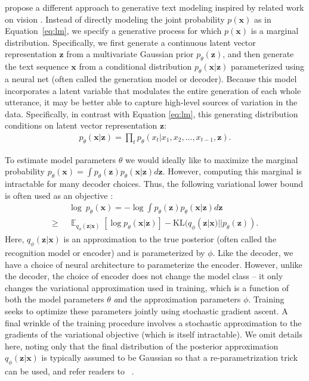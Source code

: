 \documentclass{article}
\DeclareMathOperator{\E}{\mathbb{E}}
\begin{document}
\citet{bowman2015generating} propose a different approach to generative text modeling inspired by related work on vision \cite{kingma2013auto}. Instead of directly modeling the joint probability $p(\mathbf{x})$
as in Equation~\ref{eq:lm}, we specify a generative process for which $p(\mathbf{x})$ is a marginal distribution. Specifically, we first generate a continuous latent vector representation $\mathbf{z}$ from a multivariate Gaussian prior $p_{\theta}(\mathbf{z})$, and then generate the text sequence $\mathbf{x}$
from a conditional distribution $p_{\theta}(\mathbf{x} | \mathbf{z})$ parameterized using a neural net (often called the generation model or decoder). Because this model incorporates a latent variable that modulates the entire generation of each whole utterance, it may be better able to capture high-level sources of variation in the data. Specifically, in contrast with Equation \ref{eq:lm}, this generating distribution conditions
on latent vector representation $\mathbf{z}$:
\begin{align}
  p_{\theta}(\mathbf{x} |\mathbf{z}) = \prod_{t}p_{\theta}(x_{t} | x_{1}, x_{2}, ..., x_{t-1}, \mathbf{z}).
\end{align}

To estimate model parameters $\theta$ we
would ideally like to maximize the marginal probability
$p_{\theta}(\mathbf{x}) = \int p_{\theta}(\mathbf{z}) p_{\theta}(\mathbf{x}| \mathbf{z}) d\mathbf{z}$.
However, computing this marginal is intractable for many decoder choices. Thus, the following variational lower bound is often used as an objective \cite{kingma2013auto}:
\begin{align*}
  &\log \ p_{\theta}(\mathbf{x}) = -\log \int  p_{\theta}(\mathbf{z}) p_{\theta}(\mathbf{x}| \mathbf{z}) d\mathbf{z} \\
\geq \ \ & \E_{q_{\phi}(\mathbf{z}|\mathbf{x})} [\log p_{\theta}(\mathbf{x}|\mathbf{z})]
       - \text{KL}(q_{\phi}(\mathbf{z}|\mathbf{x}) || p_{\theta}(\mathbf{z})).
\end{align*}
Here, $q_{\phi}(\mathbf{z} | \mathbf{x})$ is an approximation to the true posterior (often called the recognition model or encoder) and is parameterized by $\phi$. Like the decoder, we have a choice of neural architecture to parameterize the encoder. However, unlike the decoder, the choice of encoder does not change the model class -- it only changes the variational approximation used in training, which is a function of both the model parameters $\theta$ {\emph and} the approximation parameters $\phi$. Training seeks to optimize these parameters jointly using stochastic gradient ascent. A final wrinkle of the training procedure involves a stochastic approximation to the gradients of the variational objective (which is itself intractable). We omit details here, noting only that the final distribution of the posterior approximation $q_{\phi}(\mathbf{z}|\mathbf{x})$ is typically assumed to be Gaussian so that a
re-parametrization trick can be used, and refer readers to ~\cite{kingma2013auto}.
\end{document}
